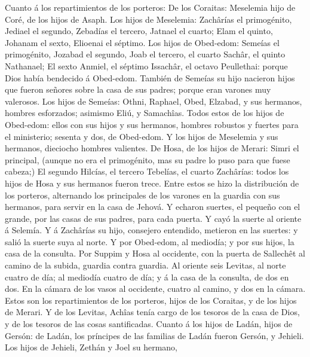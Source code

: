  Cuanto á los repartimientos de los porteros: De los
Coraitas: Meselemia hijo de Coré, de los hijos de Asaph. 
Los hijos de Meselemia: Zachârías el primogénito, Jediael el segundo,
Zebadías el tercero, Jatnael el cuarto;  Elam el quinto,
Johanam el sexto, Elioenai el séptimo.  Los hijos de
Obed-edom: Semeías el primogénito, Jozabad el segundo, Joab el tercero,
el cuarto Sachâr, el quinto Nathanael;  El sexto Anmiel, el
séptimo Issachâr, el octavo Peullethai: porque Dios había bendecido á
Obed-edom.  También de Semeías su hijo nacieron hijos que
fueron señores sobre la casa de sus padres; porque eran varones muy
valerosos.  Los hijos de Semeías: Othni, Raphael, Obed,
Elzabad, y sus hermanos, hombres esforzados; asimismo Eliú, y Samachîas.
 Todos estos de los hijos de Obed-edom: ellos con sus hijos
y sus hermanos, hombres robustos y fuertes para el ministerio; sesenta y
dos, de Obed-edom.  Y los hijos de Meselemia y sus hermanos,
dieciocho hombres valientes.  De Hosa, de los hijos de
Merari: Simri el principal, (aunque no era el primogénito, mas su padre
lo puso para que fuese cabeza;)  El segundo Hilcías, el
tercero Tebelías, el cuarto Zachârías: todos los hijos de Hosa y sus
hermanos fueron trece.  Entre estos se hizo la distribución
de los porteros, alternando los principales de los varones en la guardia
con sus hermanos, para servir en la casa de Jehová.  Y
echaron suertes, el pequeño con el grande, por las casas de sus padres,
para cada puerta.  Y cayó la suerte al oriente á Selemía. Y
á Zachârías su hijo, consejero entendido, metieron en las suertes: y
salió la suerte suya al norte.  Y por Obed-edom, al
mediodía; y por sus hijos, la casa de la consulta.  Por
Suppim y Hosa al occidente, con la puerta de Sallechêt al camino de la
subida, guardia contra guardia.  Al oriente seis Levitas,
al norte cuatro de día; al mediodía cuatro de día; y á la casa de la
consulta, de dos en dos.  En la cámara de los vasos al
occidente, cuatro al camino, y dos en la cámara.  Estos son
los repartimientos de los porteros, hijos de los Coraitas, y de los
hijos de Merari.  Y de los Levitas, Achîas tenía cargo de
los tesoros de la casa de Dios, y de los tesoros de las cosas
santificadas.  Cuanto á los hijos de Ladán, hijos de
Gersón: de Ladán, los príncipes de las familias de Ladán fueron Gersón,
y Jehieli.  Los hijos de Jehieli, Zethán y Joel su hermano,
